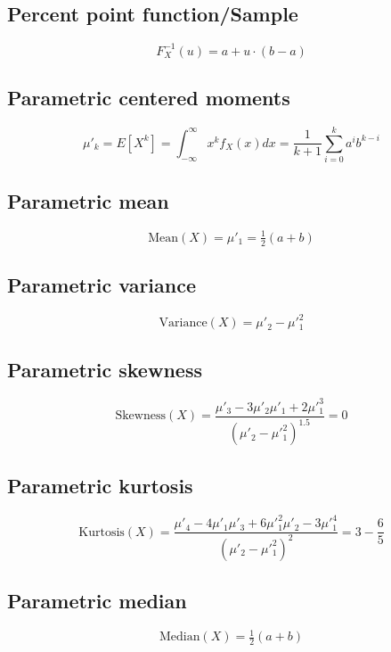 \documentclass{article}
\begin{document}
\subsection{Percent point function/Sample}
\begin{equation*} F^{-1}_{X}\left(u\right)=a+u\cdot(b-a) \end{equation*}
\subsection{Parametric centered moments}
\begin{equation*} \mu'_{k}=E[X^k]=\int_{-\infty }^{\infty }x^{k}f_{X}\left(x\right)dx=\frac{1}{k+1}\sum_{i=0}^k a^ib^{k-i} \end{equation*}
\subsection{Parametric mean}
\begin{equation*} \mathrm{Mean}(X)=\mu'_{1}=\tfrac{1}{2}(a+b) \end{equation*}
\subsection{Parametric variance}
\begin{equation*} \mathrm{Variance}(X)=\mu'_{2}-\mu'^{2}_{1} \end{equation*}
\subsection{Parametric skewness}
\begin{equation*} \mathrm{Skewness}(X)=\frac{\mu'_{3}-3\mu'_{2}\mu'_{1}+2\mu'^{3}_{1}}{(\mu'_{2}-\mu'^{2}_{1})^{1.5}}=0 \end{equation*}
\subsection{Parametric kurtosis}
\begin{equation*} \mathrm{Kurtosis}(X)=\frac{\mu'_{4}-4\mu'_{1}\mu'_{3}+6\mu'^{2}_{1}\mu'_{2}-3\mu'^{4}_{1}}{(\mu'_{2}-\mu'^{2}_{1})^{2}}=3-\frac{6}{5} \end{equation*}
\subsection{Parametric median}
\begin{equation*} \mathrm{Median}(X)=\tfrac{1}{2}(a+b) \end{equation*}
\end{document}
